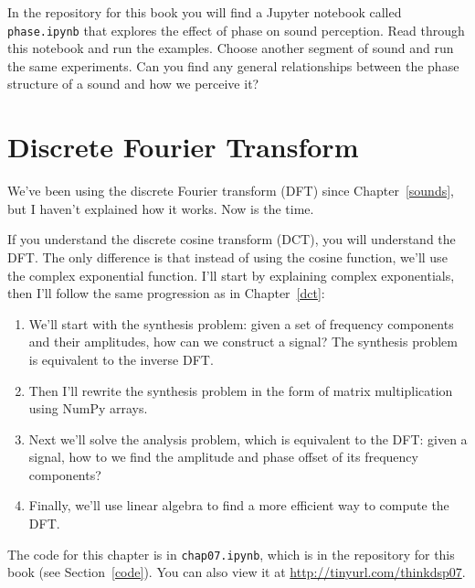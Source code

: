 \documentclass[12pt]{book}
\begin{document}
\begin{exercise}
In the repository for this book you will find a Jupyter notebook
called \verb"phase.ipynb" that explores the effect of phase on sound
perception.
Read through this notebook and run the examples.
Choose another segment of sound and run the same experiments.
Can you find any general relationships between the phase structure
of a sound and how we perceive it?
\end{exercise}




\chapter{Discrete Fourier Transform}
\label{dft}

We've been using the discrete Fourier transform (DFT) since
Chapter~\ref{sounds}, but I haven't explained how it works.  Now is
the time.

If you understand the discrete cosine transform (DCT), you will
understand the DFT.  The only difference is that instead of using the
cosine function, we'll use the complex exponential function.  I'll
start by explaining complex exponentials, then I'll follow the
same progression as in Chapter~\ref{dct}:

\begin{enumerate}

\item We'll start with the synthesis
  problem: given a set of frequency components and their amplitudes,
  how can we construct a signal?  The synthesis problem is
  equivalent to the inverse DFT.

\item Then I'll rewrite the synthesis problem in the form of matrix
  multiplication using NumPy arrays.

\item Next we'll solve the analysis problem, which is equivalent to
  the DFT: given a signal, how to we find the amplitude and phase
  offset of its frequency components?

\item Finally, we'll use linear algebra to find a more efficient way
  to compute the DFT.

\end{enumerate}

The code for this chapter is in {\tt chap07.ipynb}, which is in the
repository for this book (see Section~\ref{code}).
You can also view it at \url{http://tinyurl.com/thinkdsp07}.
\end{document}
